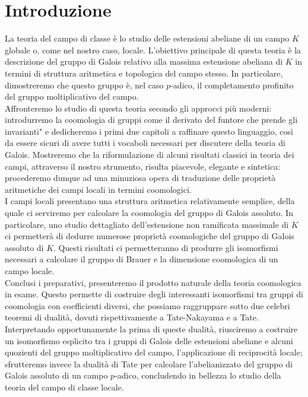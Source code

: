 \chapter*{Introduzione}

La teoria del campo di classe è lo studio delle estensioni abeliane di un campo $ K $ globale o, come nel nostro caso, locale. L'obiettivo principale di questa teoria è la descrizione del gruppo di Galois relativo alla massima estensione abeliana di $K$ in termini di struttura aritmetica e topologica del campo stesso. In particolare, dimostreremo che questo gruppo è, nel caso $p$-adico, il completamento profinito del gruppo moltiplicativo del campo. \\

Affronteremo lo studio di questa teoria secondo gli approcci più moderni: introdurremo la coomologia di gruppi come il derivato del funtore che \leftquote prende gli invarianti" e dedicheremo i primi due capitoli a raffinare questo linguaggio, così da essere sicuri di avere tutti i vocaboli necessari per discutere della teoria di Galois. Mostreremo che la riformulazione di alcuni risultati classici in teoria dei campi, attraverso il nostro strumento, risulta piacevole, elegante e sintetica: procederemo dunque ad una minuziosa opera di traduzione delle proprietà aritmetiche dei campi locali in termini coomologici. \\

I campi locali presentano una struttura aritmetica relativamente semplice, della quale ci serviremo per calcolare la coomologia del gruppo di Galois assoluto. In particolare, uno studio dettagliato dell'estensione non ramificata massimale di $K$ ci permetterà di dedurre numerose proprietà coomologiche del gruppo di Galois assoluto di $K$. Questi risultati ci permetteranno di produrre gli isomorfismi necessari a calcolare il gruppo di Brauer e la dimensione coomologica di un campo locale. \\

Conclusi i preparativi, presenteremo il prodotto naturale della teoria coomologica in esame. Questo permette di costruire degli interessanti isomorfismi tra gruppi di coomologia con coefficienti diversi, che possiamo raggruppare sotto due celebri teoremi di dualità, dovuti rispettivamente a Tate-Nakayama e a Tate. Interpretando opportunamente la prima di queste dualità, riusciremo a costruire un isomorfismo esplicito tra i gruppi di Galois delle estensioni abeliane e alcuni quozienti del gruppo  moltiplicativo del campo, l'applicazione di reciprocità locale; sfrutteremo invece la dualità di Tate per calcolare l'abelianizzato del gruppo di Galois assoluto di un campo $ p $-adico, concludendo in bellezza lo studio della teoria del campo di classe locale. \\



\vfill\break
